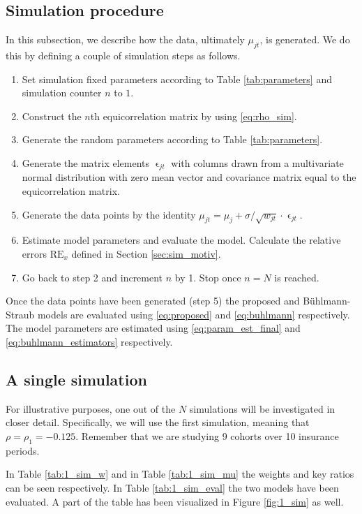 \documentclass[11pt]{article}
\theoremstyle{definition}
\begin{document}
\subsection{Simulation procedure}
In this subsection, we describe how the data, ultimately $\mu_{jt}$, is generated. We do this by defining a couple of simulation steps as follows.
\begin{enumerate}
    \item Set simulation fixed parameters according to Table \ref{tab:parameters} and simulation counter $n$ to $1$.
    \item Construct the $n$th equicorrelation matrix by using \eqref{eq:rho_sim}. 
    \item Generate the random parameters according to Table \ref{tab:parameters}.
    \item Generate the matrix elements $\upvarepsilon_{jt}$ with columns drawn from a multivariate normal distribution with zero mean vector and covariance matrix equal to the equicorrelation matrix.
    \item Generate the data points by the identity $\mu_{jt}=\mu_j + \sigma/\sqrt{w_{jt}} \cdot \upvarepsilon_{jt}$.
    \item Estimate model parameters and evaluate the model. Calculate the relative errors $\text{RE}_x$ defined in Section \ref{sec:sim_motiv}.
    \item Go back to step 2 and increment $n$ by 1. Stop once $n=N$ is reached.
\end{enumerate}
Once the data points have been generated (step 5) the proposed and Bühlmann-Straub models are evaluated using \eqref{eq:proposed} and \eqref{eq:buhlmann} respectively. The model parameters are estimated using \eqref{eq:param_est_final} and \eqref{eq:buhlmann_estimators} respectively.

\subsection{A single simulation}
For illustrative purposes, one out of the $N$ simulations will be investigated in closer detail. Specifically, we will use the first simulation, meaning that $\rho = \rho_1 = -0.125$. Remember that we are studying 9 cohorts over 10 insurance periods.

In Table \ref{tab:1_sim_w} and in Table \ref{tab:1_sim_mu} the weights and key ratios can be seen respectively. In Table \ref{tab:1_sim_eval} the two models have been evaluated. A part of the table has been visualized in Figure \ref{fig:1_sim} as well. 
\end{document}
